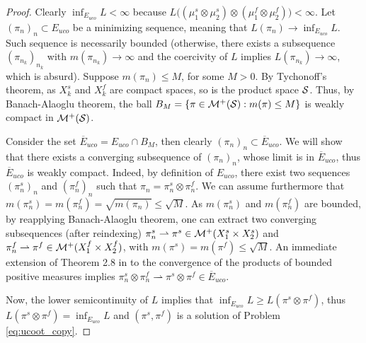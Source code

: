 \begin{proof}
  Clearly $\inf_{E_{uco}} L < \infty$ because
  $L\big( (\mu_1^s \otimes \mu_2^s) \otimes (\mu_1^f \otimes \mu_2^f) \big) < \infty$.
  Let $(\pi_n)_n \subset {E_{uco}}$ be a minimizing sequence, meaning that
  $L(\pi_n) \to \inf_{E_{uco}} L$.
  Such sequence is necessarily bounded (otherwise, there exists a subsequence $(\pi_{n_k})_{n_k}$
  with $m(\pi_{n_k}) \to \infty$ and the coercivity of $L$ implies $L(\pi_{n_k}) \to \infty$,
  which is absurd). Suppose $m(\pi_{n}) \leq M$, for some $M > 0$. By Tychonoff's theorem,
  as $X_k^s$ and $X_k^f$ are compact spaces,
  so is the product space $\mathcal S$. Thus, by Banach-Alaoglu theorem,
  the ball $B_M = \{ \pi \in \mathcal M^+(\mathcal S): m(\pi) \leq M \}$
  is weakly compact in $\mathcal M^+(\mathcal S)$.

  Consider the set $\overline{E}_{uco} = E_{uco} \cap B_M$, then clearly
  $(\pi_n)_n \subset \overline{E}_{uco}$. We will show that
  there exists a converging subsequence of $(\pi_n)_n$, whose limit is in $\overline{E}_{uco}$,
  thus $\overline{E}_{uco}$ is weakly compact. Indeed, by definition of $E_{uco}$,
  there exist two sequences $(\pi_n^s)_n$ and $(\pi_n^f)_n$ such that
  $\pi_n = \pi_n^s \otimes \pi_n^f$.
  We can assume furthermore that $m(\pi_n^s) = m(\pi_n^f) = \sqrt{m(\pi_n)} \leq \sqrt M$.
  As $m(\pi_n^s)$ and $m(\pi_n^f)$ are bounded, by reapplying Banach-Alaoglu theorem,
  one can extract two converging subsequences (after reindexing)
  $\pi_n^s \rightharpoonup \pi^s \in \mathcal M^+(X_1^s \times X_2^s)$ and
  $\pi_n^f \rightharpoonup \pi^f \in \mathcal M^+(X_1^f \times X_2^f)$,
  with $m(\pi^s) = m(\pi^f) \leq \sqrt{M}$.
  An immediate extension of Theorem 2.8 in \citep{Billingsley99} to the convergence of
  the products of bounded positive measures implies
  $\pi_n^s \otimes \pi_n^f \rightharpoonup \pi^s \otimes \pi^f \in \overline{E}_{uco}$.

  Now, the lower semicontinuity of $L$ implies that $\inf_{E_{uco}} L \geq L(\pi^s \otimes \pi^f)$,
  thus $L(\pi^s \otimes \pi^f) = \inf_{E_{uco}} L$ and $(\pi^s, \pi^f)$
  is a solution of Problem \eqref{eq:ucoot_copy}.
\end{proof}

